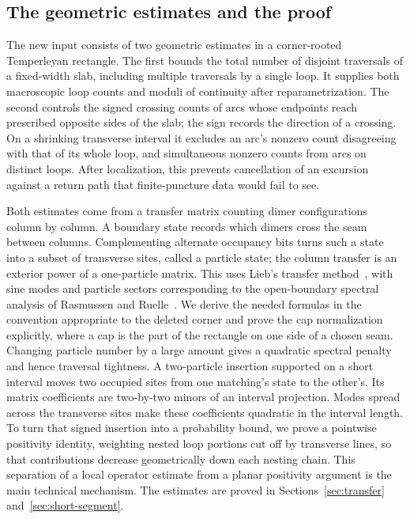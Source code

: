 \subsection{The geometric estimates and the proof}

The new input consists of two geometric estimates in a corner-rooted
Temperleyan rectangle. The first bounds the total number of disjoint
traversals of a fixed-width slab, including multiple traversals by a single
loop. It supplies both macroscopic loop counts and moduli of continuity
after reparametrization. The second controls the signed crossing counts
of arcs whose endpoints reach prescribed opposite sides of the slab;
the sign records the direction of a crossing. On a shrinking transverse
interval it excludes an arc's nonzero count disagreeing with that of its
whole loop, and simultaneous nonzero counts from arcs on distinct loops.
After localization, this prevents cancellation of an excursion against a
return path that finite-puncture data would fail to see.

Both estimates come from a transfer matrix counting dimer configurations
column by column. A boundary state records which dimers cross the seam
between columns. Complementing alternate occupancy bits turns such a
state into a subset of transverse sites, called a particle state; the
column transfer is an exterior power of a one-particle matrix.
This uses Lieb's transfer method~\cite{Lieb}, with sine modes and
particle sectors corresponding to the open-boundary spectral analysis of
Rasmussen and Ruelle~\cite[Section~IV~A]{RR}. We derive the needed formulas in
the convention appropriate to the deleted corner and prove the cap
normalization explicitly, where a cap is the part of the rectangle on
one side of a chosen seam.
Changing particle number by a large amount gives a quadratic spectral
penalty and hence traversal tightness. A two-particle insertion supported
on a short interval moves two occupied sites from one matching's state to
the other's. Its matrix coefficients are two-by-two minors
of an interval projection. Modes spread across the transverse sites make these coefficients
quadratic in the interval length. To turn that signed insertion into a
probability bound, we prove a pointwise positivity identity, weighting
nested loop portions cut off by transverse lines, so that contributions
decrease geometrically down each
nesting chain. This separation of a local operator estimate from a planar
positivity argument is the main technical mechanism. The estimates are
proved in Sections~\ref{sec:transfer} and~\ref{sec:short-segment}.

